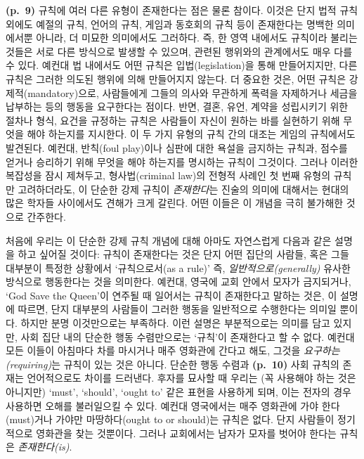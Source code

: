 \documentclass[12pt, oneside]{book}  %
\begin{document}
\textbf{(p.~9)} 규칙에 여러 다른 유형이 존재한다는 점은 물론 참이다.
이것은 단지 법적 규칙 외에도 예절의 규칙, 언어의 규칙, 게임과 동호회의
규칙 등이 존재한다는 명백한 의미에서뿐 아니라, 더 미묘한 의미에서도
그러하다. 즉, 한 영역 내에서도 규칙이라 불리는 것들은 서로 다른 방식으로
발생할 수 있으며, 관련된 행위와의 관계에서도 매우 다를 수 있다. 예컨대
법 내에서도 어떤 규칙은 입법(legislation)을 통해 만들어지지만, 다른
규칙은 그러한 의도된 행위에 의해 만들어지지 않는다. 더 중요한 것은, 어떤
규칙은 강제적(mandatory)으로, 사람들에게 그들의 의사와 무관하게 폭력을
자제하거나 세금을 납부하는 등의 행동을 요구한다는 점이다. 반면, 결혼,
유언, 계약을 성립시키기 위한 절차나 형식, 요건을 규정하는 규칙은
사람들이 자신이 원하는 바를 실현하기 위해 무엇을 해야 하는지를 지시한다.
이 두 가지 유형의 규칙 간의 대조는 게임의 규칙에서도 발견된다. 예컨대,
반칙(foul play)이나 심판에 대한 욕설을 금지하는 규칙과, 점수를 얻거나
승리하기 위해 무엇을 해야 하는지를 명시하는 규칙이 그것이다. 그러나
이러한 복잡성을 잠시 제쳐두고, 형사법(criminal law)의 전형적 사례인 첫
번째 유형의 규칙만 고려하더라도, 이 단순한 강제 규칙이 \emph{존재한다}는
진술의 의미에 대해서는 현대의 많은 학자들 사이에서도 견해가 크게 갈린다.
어떤 이들은 이 개념을 극히 불가해한 것으로 간주한다.

처음에 우리는 이 단순한 강제 규칙 개념에 대해 아마도 자연스럽게 다음과
같은 설명을 하고 싶어질 것이다: 규칙이 존재한다는 것은 단지 어떤 집단의
사람들, 혹은 그들 대부분이 특정한 상황에서 `규칙으로서(as a rule)' 즉,
\emph{일반적으로(generally)} 유사한 방식으로 행동한다는 것을 의미한다.
예컨대, 영국에 교회 안에서 모자가 금지되거나, `God Save the Queen'이
연주될 때 일어서는 규칙이 존재한다고 말하는 것은, 이 설명에 따르면, 단지
대부분의 사람들이 그러한 행동을 일반적으로 수행한다는 의미일 뿐이다.
하지만 분명 이것만으로는 부족하다. 이런 설명은 부분적으로는 의미를 담고
있지만, 사회 집단 내의 단순한 행동 수렴만으로는 `규칙'이 존재한다고 할
수 없다. 예컨대 모든 이들이 아침마다 차를 마시거나 매주 영화관에 간다고
해도, 그것을 \emph{요구하는(requiring)}는 규칙이 있는 것은 아니다.
단순한 행동 수렴과 \textbf{(p.~10)} 사회 규칙의 존재는 언어적으로도
차이를 드러낸다. 후자를 묘사할 때 우리는 (꼭 사용해야 하는 것은
아니지만) `must', `should', `ought to' 같은 표현을 사용하게 되며, 이는
전자의 경우 사용하면 오해를 불러일으킬 수 있다. 예컨대 영국에서는 매주
영화관에 가야 한다(must)거나 가야만 마땅하다(ought to or should)는
규칙은 없다. 단지 사람들이 정기적으로 영화관을 찾는 것뿐이다. 그러나
교회에서는 남자가 모자를 벗어야 한다는 규칙은 \emph{존재한다(is)}.
\end{document}
